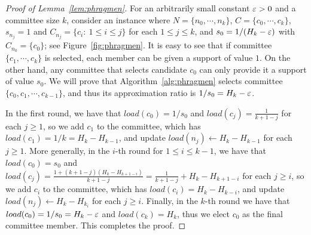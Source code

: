 \begin{proof}[Proof of Lemma~\ref{lem:phragmen}]
For an arbitrarily small constant $\varepsilon>0$ and a committee size $k$, consider an instance where $N=\{n_0, \cdots, n_k\}$, $C=\{c_0, \cdots, c_k\}$, $s_{n_j}=1$ and $C_{n_j}=\{c_i: \ 1\leq i\leq j\}$ for each $1\leq j\leq k$, and $s_0=1/(H_k - \varepsilon)$ with $C_{n_0}=\{c_0\}$; see Figure~\ref{fig:phragmen}. 
It is easy to see that if committee $\{c_1, \cdots, c_k\}$ is selected, each member can be given a support of value $1$. On the other hand, any committee that selects candidate $c_{0}$ can only provide it a support of value $s_0$. We will prove that Algorithm~\ref{alg:phragmen} selects committee $\{c_0, c_1, \cdots, c_{k-1}\}$, and thus its approximation ratio is $1/s_0 = H_k - \varepsilon$. 

In the first round, we have that $load(c_0)=1/s_0$ and $load(c_j)=\frac{1}{k+1-j}$ for each $j\geq 1$, so we add $c_1$ to the committee, which has $load(c_1)=1/k = H_k - H_{k-1}$, and update $load(n_j)\leftarrow H_k - H_{k-1}$ for each $j\geq 1$. 
More generally, in the $i$-th round for $1\leq i\leq k-1$, we have that $load(c_0)=s_0$ and $load(c_j)=\frac{1+(k+1-j)(H_k - H_{k+1-i})}{k+1-j}=\frac{1}{k+1-j}+H_k-H_{k+1-i}$ for each $j\geq i$, so we add $c_i$ to the committee, which has $load(c_i)=H_k - H_{k-i}$, and update $load(n_j)\leftarrow H_k - H_{k_i}$ for each $j\geq i$. 
Finally, in the $k$-th round we have that $load(c_0)=1/s_0 = H_k - \varepsilon$ and $load(c_k)=H_k$, thus we elect $c_0$ as the final committee member. This completes the proof.
\end{proof}